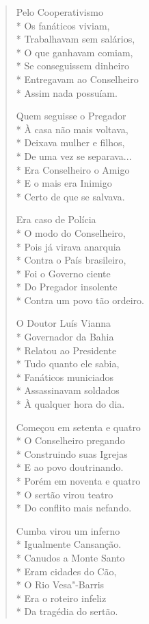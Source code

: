 \begin{verse}
Pelo Cooperativismo\\*
Os fanáticos viviam,\\*
Trabalhavam sem salários,\\*
O que ganhavam comiam,\\*
Se conseguissem dinheiro\\*
Entregavam ao Conselheiro\\*
Assim nada possuíam.

Quem seguisse o Pregador\\*
À casa não mais voltava,\\*
Deixava mulher e filhos,\\*
De uma vez se separava...\\*
Era Conselheiro o Amigo\\*
E o mais era Inimigo\\*
Certo de que se salvava.

Era caso de Polícia\\*
O modo do Conselheiro,\\*
Pois já virava anarquia\\*
Contra o País brasileiro,\\*
Foi o Governo ciente\\*
Do Pregador insolente\\*
Contra um povo tão ordeiro.

O Doutor Luís Vianna\\*
Governador da Bahia\\*
Relatou ao Presidente\\*
Tudo quanto ele sabia,\\*
Fanáticos municiados\\*
Assassinavam soldados\\*
À qualquer hora do dia.

Começou em setenta e quatro\\*
O Conselheiro pregando\\*
Construindo suas Igrejas\\*
E ao povo doutrinando.\\*
Porém em noventa e quatro\\*
O sertão virou teatro\\*
Do conflito mais nefando.

Cumba virou um inferno\\*
Igualmente Cansanção.\\*
Canudos a Monte Santo\\*
Eram cidades do Cão,\\*
O Rio Vesa"-Barris\\*
Era o roteiro infeliz\\*
Da tragédia do sertão.


\end{verse}
